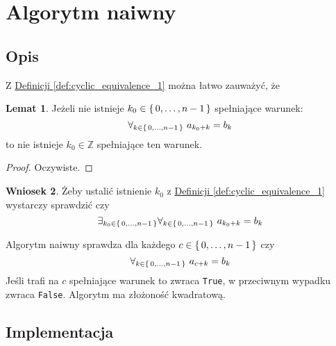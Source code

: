 \documentclass{scrartcl}
\theoremstyle{definition}
\theoremstyle{definition}
\newtheorem{lemma_k0_values}{Lemat}[section]
\newtheorem{less_k0_values_to_check}[lemma_k0_values]{Wniosek}
\begin{document}
\section{Algorytm naiwny}
\subsection{Opis}
Z \hyperref[def:cyclic_equivalence_1]
{Definicji \ref*{def:cyclic_equivalence_1}}
można łatwo zauważyć, że
\begin{lemma_k0_values}
    \label{lem:lemma_k0_values}
    Jeżeli nie istnieje \(k_0\in\set{0,\ldots, n-1}\) spełniające warunek:
    \[\forall_{k\in\set{0,\ldots,n-1}}\ a_{k_0+k}=b_k\]
    to nie istnieje \(k_0\in\mathbb{Z}\) spełniające ten warunek.
\end{lemma_k0_values}
\begin{proof}
    Oczywiste.
\end{proof}
\begin{less_k0_values_to_check}
    \label{cor:less_k0_values_to_check}
    Żeby ustalić istnienie \(k_0\) z
    \hyperref[def:cyclic_equivalence_1]
    {Definicji \ref*{def:cyclic_equivalence_1}}
    wystarczy sprawdzić czy
    \[\exists_{k_0\in\set{0,\ldots,n-1}}
        \forall_{k\in\set{0,\ldots,n-1}}\ a_{k_0+k}=b_k\]
\end{less_k0_values_to_check}

Algorytm naiwny sprawdza dla każdego \(c\in\set{0,\ldots,n-1}\)
czy \[\forall_{k\in\set{0,\ldots,n-1}}\ a_{c+k}=b_k\]
Jeśli trafi na \(c\) spełniające warunek to zwraca \lstinline|True|,
w przeciwnym wypadku zwraca \lstinline|False|.
Algorytm ma złożoność kwadratową.\cite{wazniakmimuw}
\subsection{Implementacja}
\pagebreak
\printbibliography[heading=bibintoc]
\end{document}

